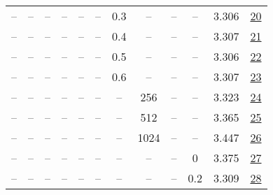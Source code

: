\begin{table}[H]
\begin{tabular}{cccccccccccc}
-- & -- & -- & -- & -- & -- & 0.3 & -- & -- & -- & 3.306 & \href{https://wandb.ai/stanford-mercury/optimizer-scaling/runs/sweep-130m-10B-sciona8b5aalr0.008-wd0.1-minlr0-warmup0-b10.98-gn-e47df7}{20} \\
-- & -- & -- & -- & -- & -- & 0.4 & -- & -- & -- & 3.307 & \href{https://wandb.ai/stanford-mercury/optimizer-scaling/runs/sweep-130m-10B-scionb02b9dlr0.008-wd0.1-minlr0-warmup0-b10.98-gn-c39e4a}{21} \\
-- & -- & -- & -- & -- & -- & 0.5 & -- & -- & -- & 3.306 & \href{https://wandb.ai/stanford-mercury/optimizer-scaling/runs/sweep-130m-10B-scion38a308lr0.008-wd0.1-minlr0-warmup0-b10.98-gn-1b6e87}{22} \\
-- & -- & -- & -- & -- & -- & 0.6 & -- & -- & -- & 3.307 & \href{https://wandb.ai/stanford-mercury/optimizer-scaling/runs/sweep-130m-10B-scion0eab92lr0.008-wd0.1-minlr0-warmup0-b10.98-gn-3e5a9b}{23} \\
-- & -- & -- & -- & -- & -- & -- & 256 & -- & -- & 3.323 & \href{https://wandb.ai/stanford-mercury/optimizer-scaling/runs/sweep-130m-10B-scion7ca424lr0.008-wd0.1-minlr0-warmup0-b10.98-gn-d5e3b1}{24} \\
-- & -- & -- & -- & -- & -- & -- & 512 & -- & -- & 3.365 & \href{https://wandb.ai/stanford-mercury/optimizer-scaling/runs/sweep-130m-10B-scion2cfaa6lr0.008-wd0.1-minlr0-warmup0-b10.98-gn-e446fe}{25} \\
-- & -- & -- & -- & -- & -- & -- & 1024 & -- & -- & 3.447 & \href{https://wandb.ai/stanford-mercury/optimizer-scaling/runs/sweep-130m-10B-scionafb44flr0.008-wd0.1-minlr0-warmup0-b10.98-gn-6aaf5e}{26} \\
-- & -- & -- & -- & -- & -- & -- & -- & -- & 0 & 3.375 & \href{https://wandb.ai/stanford-mercury/optimizer-scaling/runs/sweep-130m-10B-scion0b9b71lr0.008-wd0-minlr0-warmup0-b10.98-gn2--f9d527}{27} \\
-- & -- & -- & -- & -- & -- & -- & -- & -- & 0.2 & 3.309 & \href{https://wandb.ai/stanford-mercury/optimizer-scaling/runs/sweep-130m-10B-sciona5af5alr0.008-wd0.2-minlr0-warmup0-b10.98-gn-d9175f}{28} \\
\bottomrule
\end{tabular}
\end{table}

